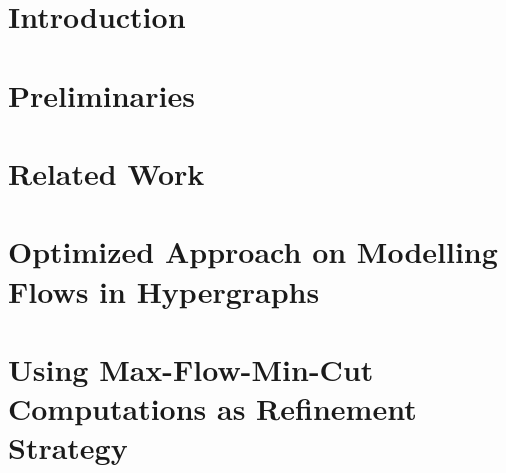 \documentclass[12pt,a4paper,twoside, enabledeprecatedfontcommands]{scrartcl}
\numberwithin{equation}{section}
\begin{document}
\tableofcontents

\clearpage


%


\section{Introduction}



\newpage


\section{Preliminaries}
\label{sec:preliminaries}



\newpage


\section{Related Work}
\label{sec:related_work}



\newpage


\section{Optimized Approach on Modelling Flows in Hypergraphs}
\label{sec:opt_flow_network}


\newpage


\section{Using Max-Flow-Min-Cut Computations as Refinement Strategy}
\label{sec:flow_refinement}
\end{document}
